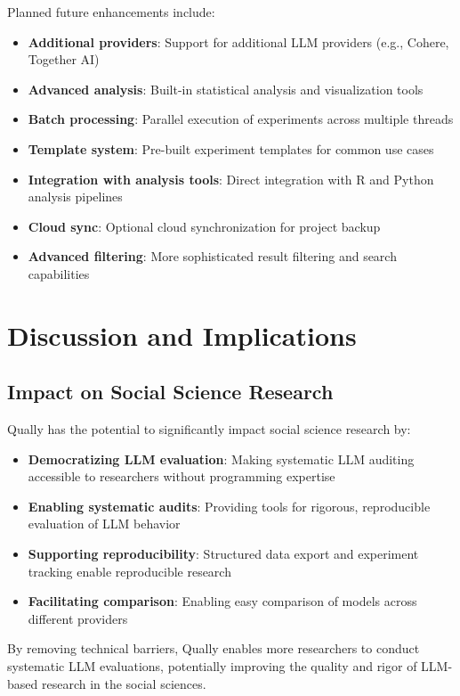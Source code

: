 \documentclass[11pt,a4paper]{article}
\begin{document}
Planned future enhancements include:

\begin{itemize}
    \item \textbf{Additional providers}: Support for additional LLM providers (e.g., Cohere, Together AI)
    \item \textbf{Advanced analysis}: Built-in statistical analysis and visualization tools
    \item \textbf{Batch processing}: Parallel execution of experiments across multiple threads
    \item \textbf{Template system}: Pre-built experiment templates for common use cases
    \item \textbf{Integration with analysis tools}: Direct integration with R and Python analysis pipelines
    \item \textbf{Cloud sync}: Optional cloud synchronization for project backup
    \item \textbf{Advanced filtering}: More sophisticated result filtering and search capabilities
\end{itemize}

\section{Discussion and Implications}
\label{sec:discussion}

\subsection{Impact on Social Science Research}

Qually has the potential to significantly impact social science research by:

\begin{itemize}
    \item \textbf{Democratizing LLM evaluation}: Making systematic LLM auditing accessible to researchers without programming expertise
    \item \textbf{Enabling systematic audits}: Providing tools for rigorous, reproducible evaluation of LLM behavior
    \item \textbf{Supporting reproducibility}: Structured data export and experiment tracking enable reproducible research
    \item \textbf{Facilitating comparison}: Enabling easy comparison of models across different providers
\end{itemize}

By removing technical barriers, Qually enables more researchers to conduct systematic LLM evaluations, potentially improving the quality and rigor of LLM-based research in the social sciences.
\end{document}
